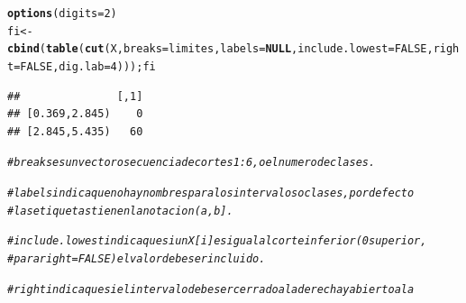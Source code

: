 \documentclass[12pt,letterpaper]{article}\usepackage[]{graphicx}\usepackage[]{color}
\makeatletter
\newcommand{\hlnum}[1]{\textcolor[rgb]{0.686,0.059,0.569}{#1}}%
\newcommand{\hlcom}[1]{\textcolor[rgb]{0.678,0.584,0.686}{\textit{#1}}}%
\newcommand{\hlstd}[1]{\textcolor[rgb]{0.345,0.345,0.345}{#1}}%
\newcommand{\hlkwa}[1]{\textcolor[rgb]{0.161,0.373,0.58}{\textbf{#1}}}%
\newcommand{\hlkwb}[1]{\textcolor[rgb]{0.69,0.353,0.396}{#1}}%
\newcommand{\hlkwc}[1]{\textcolor[rgb]{0.333,0.667,0.333}{#1}}%
\newcommand{\hlkwd}[1]{\textcolor[rgb]{0.737,0.353,0.396}{\textbf{#1}}}%
\newenvironment{kframe}{%
 \def\at@end@of@kframe{}%
 \ifinner\ifhmode%
  \def\at@end@of@kframe{\end{minipage}}%
  \begin{minipage}{\columnwidth}%
 \fi\fi%
 \def\FrameCommand##1{\hskip\@totalleftmargin \hskip-\fboxsep
 \colorbox{shadecolor}{##1}\hskip-\fboxsep
     \hskip-\linewidth \hskip-\@totalleftmargin \hskip\columnwidth}%
 \MakeFramed {\advance\hsize-\width
   \@totalleftmargin\z@ \linewidth\hsize
   \@setminipage}}%
 {\par\unskip\endMakeFramed%
 \at@end@of@kframe}
\newenvironment{knitrout}{}{} %
\makeatother
\begin{document}
\begin{enumerate}
\begin{knitrout}
\begin{kframe}
\begin{alltt}
\hlkwd{options}\hlstd{(}\hlkwc{digits}\hlstd{=}\hlnum{2}\hlstd{)}
\hlstd{fi} \hlkwb{<-} \hlkwd{cbind}\hlstd{(}\hlkwd{table}\hlstd{(}\hlkwd{cut}\hlstd{(X,} \hlkwc{breaks} \hlstd{= limites,} \hlkwc{labels}\hlstd{=}\hlkwa{NULL}\hlstd{,} \hlkwc{include.lowest}\hlstd{=}\hlnum{FALSE}\hlstd{,} \hlkwc{right}\hlstd{=}\hlnum{FALSE}\hlstd{,} \hlkwc{dig.lab}\hlstd{=}\hlnum{4}\hlstd{))); fi}
\end{alltt}
\begin{verbatim}
##               [,1]
## [0.369,2.845)    0
## [2.845,5.435)   60
\end{verbatim}
\end{kframe}
\end{knitrout}

\begin{knitrout}
\color{fgcolor}\begin{kframe}
\begin{alltt}
\hlcom{# breakses un vector o secuencia de cortes 1:6, o el numero de clases.}
\end{alltt}
\end{kframe}
\end{knitrout}
\begin{knitrout}
\color{fgcolor}\begin{kframe}
\begin{alltt}
\hlcom{# labelsindica que no hay nombres para los intervalos o clases, por defecto }
\hlcom{# las etiquetas tienen la notacion (a, b].}
\end{alltt}
\end{kframe}
\end{knitrout}
\begin{knitrout}
\color{fgcolor}\begin{kframe}
\begin{alltt}
\hlcom{# include.lowestindica que si un X[i] es igual al corte inferior (0 superior, }
\hlcom{# para right=FALSE) el valor debe ser incluido.}
\end{alltt}
\end{kframe}
\end{knitrout}
\begin{knitrout}
\color{fgcolor}\begin{kframe}
\begin{alltt}
\hlcom{# rightindica que si el intervalo debe ser cerradoa la derecha y abierto a la}

\end{alltt}
\end{kframe}
\end{knitrout}
\end{enumerate}
\end{document}
